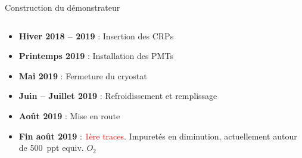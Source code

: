 \begin{frame}{Construction du démonstrateur}
\begin{columns}
\begin{column}{0.55\textwidth}
\begin{scriptsize}
\begin{itemize}
                        \item \textbf{Hiver 2018 -- 2019} : Insertion des CRPs
                        \item \textbf{Printemps 2019} : Installation des PMTs
                        \item \textbf{Mai 2019} : Fermeture du cryostat
                        \item \textbf{Juin -- Juillet 2019} : Refroidissement et remplissage 
                        \item \textbf{Août 2019} : Mise en route
                        \item \textbf{Fin août 2019} : \textcolor{red}{1ère traces}. Impuretés en diminution, actuellement autour de \SI{500}{ppt} equiv. $O_2$
                    \end{itemize}
                \end{scriptsize}
            \end{column}
        \end{columns}
    \end{frame}
    
    {
      	\setlength\pdfpagewidth{12.8cm}%
      	\setlength\pdfpageheight{9cm}%
      	\begin{specialframe}
          	\vspace{-0.42cm}\hspace{-2.1cm}
      	\end{specialframe}
    }
    
    
    {\iftracks
       	\setlength\pdfpagewidth{12.8cm}%
       	\setlength\pdfpageheight{7cm}%
       	\begin{frame}[plain]
       	\end{frame}
     \fi}

